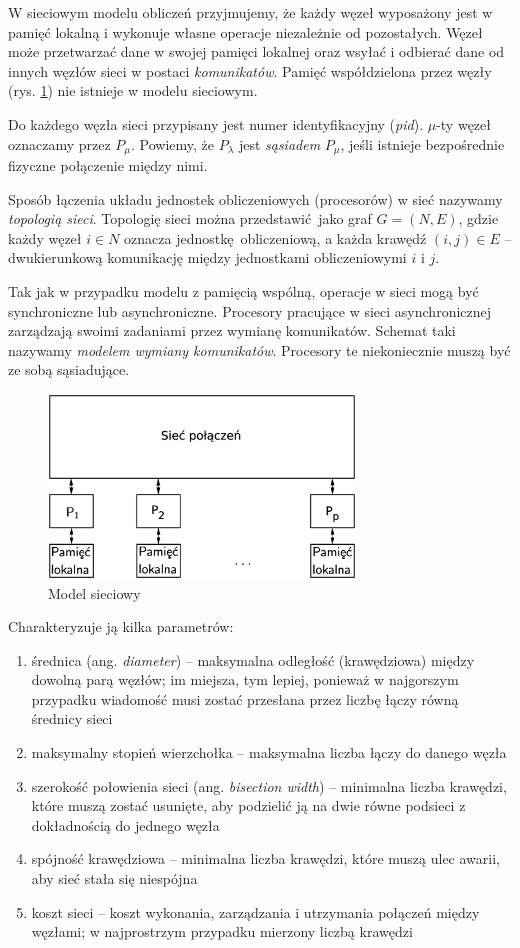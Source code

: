 W sieciowym modelu obliczeń przyjmujemy, że każdy węzeł wyposażony jest w pamięć lokalną i wykonuje własne operacje niezależnie od pozostałych. Węzeł może przetwarzać dane w swojej pamięci lokalnej oraz wsyłać i odbierać dane od innych węzłów sieci w postaci \emph{komunikatów}.  Pamięć współdzielona przez węzły (rys. \ref{fig:model_net}) nie istnieje w modelu sieciowym. 

Do każdego węzła sieci przypisany jest numer identyfikacyjny (\emph{pid}). \(\mu\)-ty węzeł oznaczamy przez \(P_\mu\). Powiemy, że \(P_\lambda\) jest \emph{sąsiadem} \(P_\mu\), jeśli istnieje bezpośrednie fizyczne połączenie między nimi.\cite{Golub}


Sposób łączenia układu jednostek obliczeniowych (procesorów) w sieć nazywamy \emph{topologią sieci}. Topologię sieci można przedstawić jako graf \(G=(N,E)\), gdzie każdy węzeł \(i\in N\) oznacza jednostkę obliczeniową, a każda krawędź \((i, j) \in E\) – dwukierunkową komunikację między jednostkami obliczeniowymi \(i\) i \(j\). 

Tak jak w przypadku modelu z pamięcią wspólną, operacje w sieci mogą być synchroniczne lub asynchroniczne. Procesory pracujące w sieci asynchronicznej zarządzają swoimi zadaniami przez wymianę komunikatów. Schemat taki nazywamy \emph{modelem wymiany komunikatów}. Procesory te niekoniecznie muszą być ze sobą sąsiadujące. 

\begin{figure}[h]
\centering
\includegraphics[width=22em]{images/Rys_net.eps}
\caption{Model sieciowy}
\label{fig:model_net}
\end{figure}

Charakteryzuje ją kilka parametrów:

\begin{enumerate}
 \item średnica (ang. \emph{diameter}) – maksymalna odległość (krawędziowa) między dowolną parą węzłów; im miejsza, tym lepiej, ponieważ w najgorszym przypadku wiadomość musi zostać przesłana przez liczbę łączy równą średnicy sieci
 \item maksymalny stopień wierzchołka – maksymalna liczba łączy do danego węzła
 \item szerokość połowienia sieci (ang. \emph{bisection width}) – minimalna liczba krawędzi, które muszą zostać usunięte, aby podzielić ją na dwie równe podsieci z dokładnością do jednego węzła
 \item spójność krawędziowa – minimalna liczba krawędzi, które muszą ulec awarii, aby sieć stała się niespójna
 \item koszt sieci – koszt wykonania, zarządzania i utrzymania połączeń między węzłami; w najprostrzym przypadku mierzony liczbą krawędzi
\end{enumerate}



